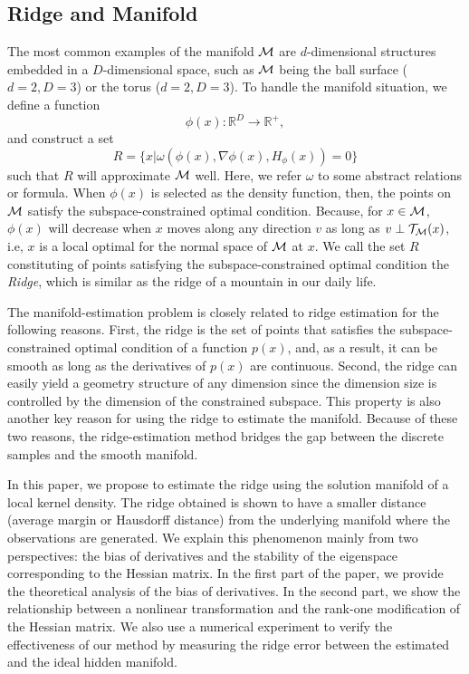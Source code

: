 \documentclass[aos,preprint]{imsart}
\theoremstyle{remark}
\begin{document}
\subsection{Ridge and Manifold}
The most common examples of the manifold $\cal M$ are $d$-dimensional structures embedded in a $D$-dimensional space, such as $\cal M$ being the ball surface ($d=2, D=3$) or the torus ($d=2, D=3$). To handle the manifold situation, we define a function 
\[\phi(x): {\mathbb R}^D\rightarrow {\mathbb R}^+,
\] 
and construct a set 
\[R = \{x | \omega (\phi(x),\nabla \phi(x), H_\phi(x))=0 \}\] 
such that $R$ will approximate $\cal M$ well. Here, we refer $\omega$ to some abstract relations or formula. When $\phi(x)$ is selected as the density function, then, the points on $\cal M$ satisfy the subspace-constrained optimal condition. Because, for $x\in \cal M$, $\phi(x)$ will decrease when $x$ moves along any direction $v$ as long as $v\perp {\cal T}_{\cal M}(x)$, i.e, $x$ is a local optimal for the normal space of $\cal M$ at $x$. We call the set $R$ constituting of points satisfying the subspace-constrained optimal condition the {\it Ridge}, which is similar as the ridge of a mountain in our daily life.




The manifold-estimation problem is closely related to ridge estimation for the following reasons. First, the ridge is the set of points that satisfies the subspace-constrained optimal condition of a function $p(x)$, and, as a result, it can be smooth as long as the derivatives of $p(x)$ are continuous. Second, the ridge can easily yield a geometry structure of any dimension since the dimension size is controlled by the dimension of the constrained subspace. This property is also another key reason for using the ridge to estimate the manifold. Because of these two reasons, the ridge-estimation method bridges the gap between the discrete samples and the smooth manifold.

In this paper, we propose to estimate the ridge using the solution manifold of a local kernel density. The ridge obtained is shown to have a smaller distance (average margin or Hausdorff distance) from the underlying manifold where the observations are generated. We explain this phenomenon mainly from two perspectives: the bias of derivatives and the stability of the eigenspace corresponding to the Hessian matrix. In the first part of the paper, we provide the theoretical analysis of the bias of derivatives. In the second part, we show the relationship between a nonlinear transformation and the rank-one modification of the Hessian matrix. We also use a numerical experiment to verify the effectiveness of our method by measuring the ridge error between the estimated and the ideal hidden manifold.
\end{document}
